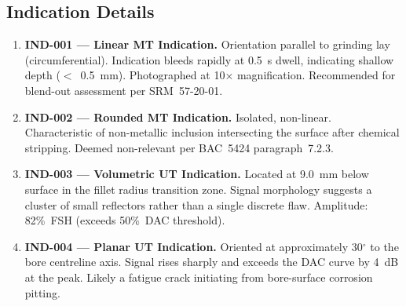 \subsection{Indication Details}
\begin{enumerate}[leftmargin=*, itemsep=2pt, topsep=4pt]
  \item \textbf{IND-001 --- Linear MT Indication.} Orientation parallel to grinding lay
        (circumferential). Indication bleeds rapidly at 0.5~s dwell, indicating shallow depth
        ($<$~0.5~mm). Photographed at 10$\times$ magnification. Recommended for blend-out
        assessment per SRM~57-20-01.
  \item \textbf{IND-002 --- Rounded MT Indication.} Isolated, non-linear. Characteristic of
        non-metallic inclusion intersecting the surface after chemical stripping. Deemed
        non-relevant per BAC~5424 paragraph~7.2.3.
  \item \textbf{IND-003 --- Volumetric UT Indication.} Located at 9.0~mm below surface in the
        fillet radius transition zone. Signal morphology suggests a cluster of small reflectors
        rather than a single discrete flaw. Amplitude: 82\%~FSH (exceeds 50\%~DAC threshold).
  \item \textbf{IND-004 --- Planar UT Indication.} Oriented at approximately 30$^{\circ}$ to the
        bore centreline axis. Signal rises sharply and exceeds the DAC curve by 4~dB at the
        peak. Likely a fatigue crack initiating from bore-surface corrosion pitting.
\end{enumerate}

